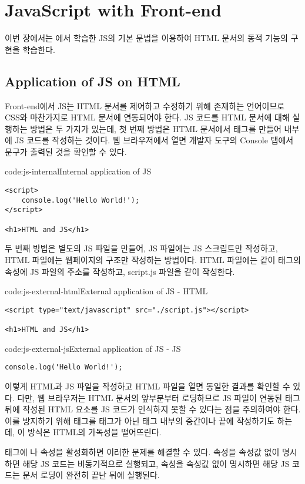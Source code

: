 \section{JavaScript with Front-end}\label{sect:js-frontend}

이번 장에서는 에서 학습한 JS의 기본 문법을 이용하여 HTML 문서의 동적 기능의 구현을 학습한다.

\subsection*{Application of JS on HTML}

Front-end에서 JS는 HTML 문서를 제어하고 수정하기 위해 존재하는 언어이므로 CSS와 마찬가지로 HTML 문서에 연동되어야 한다. JS 코드를 HTML 문서에 대해 실행하는 방법은 두 가지가 있는데, 첫 번째 방법은 HTML 문서에서  태그를 만들어 내부에 JS 코드를 작성하는 것이다. \을 웹 브라우저에서 열면 개발자 도구의 Console 탭에서  문구가 출력된 것을 확인할 수 있다.

\begin{code}{code:js-internal}{Internal application of JS}
\begin{verbatim}
<script>
    console.log('Hello World!');
</script>

<h1>HTML and JS</h1>
\end{verbatim}
\end{code}

두 번째 방법은 별도의 JS 파일을 만들어, JS 파일에는 JS 스크립트만 작성하고, HTML 파일에는 웹페이지의 구조만 작성하는 방법이다. HTML 파일에는 \과 같이  태그의  속성에 JS 파일의 주소를 작성하고, script.js 파일을 \와 같이 작성한다.

\begin{code}{code:js-external-html}{External application of JS - HTML}
\begin{verbatim}
<script type="text/javascript" src="./script.js"></script>

<h1>HTML and JS</h1>
\end{verbatim}
\end{code}

\begin{code}{code:js-external-js}{External application of JS - JS}
\begin{verbatim}
console.log('Hello World!');
\end{verbatim}
\end{code}

이렇게 HTML과 JS 파일을 작성하고 HTML 파일을 열면 \과 동일한 결과를 확인할 수 있다. 다만, 웹 브라우저는 HTML 문서의 앞부분부터 로딩하므로 JS 파일이 연동된  태그 뒤에 작성된 HTML 요소를 JS 코드가 인식하지 못할 수 있다는 점을 주의하여야 한다. 이를 방지하기 위해  태그를  태그가 아닌  태그 내부의 중간이나 끝에 작성하기도 하는데, 이 방식은 HTML의 가독성을 떨어뜨린다.

 태그에 나  속성을 활성화하면 이러한 문제를 해결할 수 있다.  속성을 속성값 없이 명시하면 해당 JS 코드는 비동기적으로 실행되고,  속성을 속성값 없이 명시하면 해당 JS 코드는 문서 로딩이 완전히 끝난 뒤에 실행된다.
